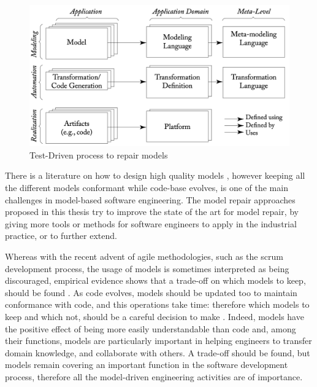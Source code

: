 \documentclass [a4paper, 12pt, twoside]{report}
\theoremstyle{plain}
\theoremstyle{definition}
\theoremstyle{remark}
\theoremstyle{plain}
\theoremstyle{plain}
\theoremstyle{remark}
\begin{document}
\begin{figure}[!htb]
	\centering
	\includegraphics[width=.8\columnwidth]{mdse.png}
	\caption{Test-Driven process to repair models}
	\label{fig:mdse}
\end{figure}

There is a literature on how to design high quality models \cite{Krogstie:2012:MDE:2331118}, however keeping all the different models conformant while code-base evolves, is one of the main challenges in model-based software engineering.
The model repair approaches proposed in this thesis try to improve the state of the art for model repair, by giving more tools or methods for software engineers to apply in the industrial practice, or to further extend.




Whereas with the recent advent of agile methodologies, such as the scrum development process, the usage of models is sometimes interpreted as being discouraged, empirical evidence shows that a trade-off on which models to keep, should be found \cite{blasband2016rise}. As code evolves, models should be updated too to maintain conformance with code, and this operations take time: therefore which models to keep and which not, should be a careful decision to make \cite{blasband2016rise}.
Indeed, models have the positive effect of being more easily understandable than code and, among their functions, models are particularly important in helping engineers to transfer domain knowledge, and collaborate with others.
A trade-off should be found, but models remain covering an important function in the software development process, therefore all the model-driven engineering activities are of importance.
\end{document}
